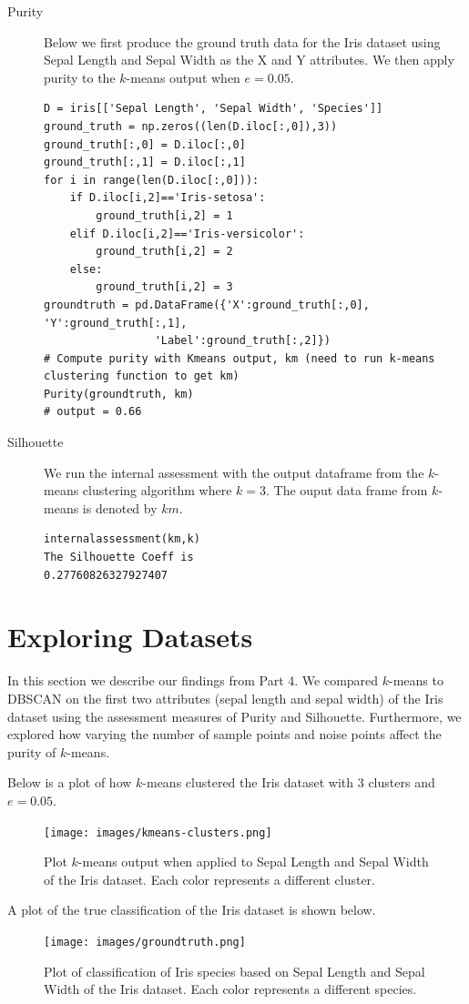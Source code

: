 \documentclass[psamsfonts,onesided,10pt]{amsart}
\begin{document}
\begin{description}
\item[Purity] Below we first produce the ground truth data for the Iris dataset using Sepal Length 
and Sepal Width as the X and Y attributes. We then apply purity to the $k$-means output when $e=0.05$. 
\begin{verbatim}
D = iris[['Sepal Length', 'Sepal Width', 'Species']]
ground_truth = np.zeros((len(D.iloc[:,0]),3))
ground_truth[:,0] = D.iloc[:,0]
ground_truth[:,1] = D.iloc[:,1]
for i in range(len(D.iloc[:,0])):
    if D.iloc[i,2]=='Iris-setosa':
        ground_truth[i,2] = 1
    elif D.iloc[i,2]=='Iris-versicolor':
        ground_truth[i,2] = 2
    else:
        ground_truth[i,2] = 3
groundtruth = pd.DataFrame({'X':ground_truth[:,0], 'Y':ground_truth[:,1], 
                 'Label':ground_truth[:,2]})       
# Compute purity with Kmeans output, km (need to run k-means clustering function to get km)
Purity(groundtruth, km)
# output = 0.66
\end{verbatim}
\item[Silhouette] We run the internal assessment with the output dataframe from the 
$k$-means clustering algorithm where $k=3$. The ouput data frame from $k$-means is denoted by $km$.
\begin{verbatim}
internalassessment(km,k)
The Silhouette Coeff is 
0.27760826327927407
\end{verbatim}
\end{description}

\section{Exploring Datasets}
In this section we describe our findings from Part 4. We compared $k$-means to DBSCAN on the 
first two attributes (sepal length and sepal width) of the Iris dataset using the assessment 
measures of Purity and Silhouette. Furthermore, we explored 
how varying the number of sample points and noise points affect the purity of $k$-means. 

Below is a plot of how $k$-means clustered the Iris dataset with 3 clusters and $e=0.05$.
\begin{figure}[H]
    \centering
    {\texttt{[image: images/kmeans-clusters.png]}} \\
    \caption{Plot $k$-means output when applied to Sepal Length and Sepal Width of the Iris dataset. Each color represents a different cluster.}
\end{figure}

A plot of the true classification of the Iris dataset is shown below.
\begin{figure}[H]
    \centering
    {\texttt{[image: images/groundtruth.png]}} \\
    \caption{Plot of classification of Iris species based on Sepal Length and Sepal Width of the Iris dataset. Each color represents a different species.}
\end{figure}
\end{document}
